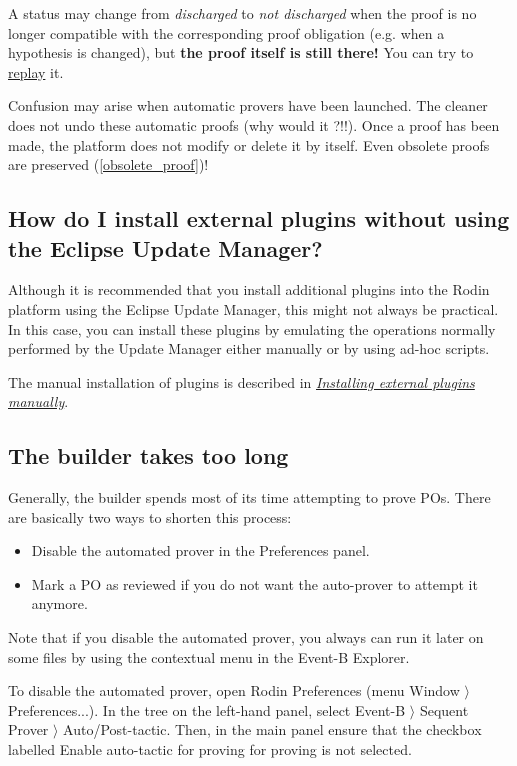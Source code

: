 A status may change from \emph{discharged} to \emph{not discharged} when the proof is no longer compatible with the corresponding proof obligation (e.g. when a hypothesis is changed), but \textbf{the proof itself is still there!}
You can try to \href{http://wiki.event-b.org/index.php/Proof_Obligation_Commands#Proof_Replay_on_Undischarged_POs}{replay} it.

Confusion may arise when automatic provers have been launched. The cleaner does not undo these automatic proofs (why would it ?!!). Once a proof has been made, the platform does not modify or delete it by itself. Even obsolete proofs are preserved (\ref{obsolete_proof})!

\subsection{How do I install external plugins without using the Eclipse Update Manager?}

Although it is recommended that you install additional plugins into the Rodin platform using the Eclipse Update Manager, this might not always be practical. In this case, you can install these plugins by emulating the operations normally performed by the Update Manager either manually or by using ad-hoc scripts. 

The manual installation of plugins is described in \href{http://wiki.event-b.org/index.php/Installing_external_plugins_manually}{\emph{Installing external plugins manually}}. 

\subsection{The builder takes too long}

Generally, the builder spends most of its time attempting to prove POs. There are basically two ways to shorten this process: 

\begin{itemize}
	\item Disable the automated prover in the \textsf{Preferences} panel. 
	\item Mark a PO as reviewed if you do not want the auto-prover to attempt it anymore. 
\end{itemize}

Note that if you disable the automated prover, you always can run it later on some files by using the contextual menu in the Event-B Explorer. 

To disable the automated prover, open \textsf{Rodin Preferences} 
(menu \textsf{Window $\rangle$ Preferences...}). In the tree on the left-hand panel, select \textsf{Event-B $\rangle$ Sequent Prover $\rangle$ Auto/Post-tactic}. Then, in the main panel ensure that the checkbox labelled \textsf{Enable auto-tactic for proving} for proving is not selected. 


